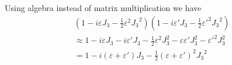 


\bigskip
Using algebra instead of matrix multiplication we have
\begin{multline*}
\left(1-i\varepsilon J_3-\tfrac{1}{2}\varepsilon^2{J_3}^2\right)
\left(1-i\varepsilon' J_3-\tfrac{1}{2}\varepsilon'^2{J_3}^2\right)
\\
{}\approx1-i\varepsilon J_3-i\varepsilon'J_3
-\tfrac{1}{2}\varepsilon^2J_3^2-\varepsilon\varepsilon'J_3^2-\varepsilon'^2J_3^2
\\
{}=1-i(\varepsilon+\varepsilon')J_3-\tfrac{1}{2}(\varepsilon+\varepsilon')^2{J_3}^2
\end{multline*}

\iffalse
For example, using
\begin{equation*}
J_3=\tfrac{1}{2}\Sigma_3
\end{equation*}

we have
\begin{multline*}
\left(1-i\varepsilon J_3-\tfrac{1}{2}\varepsilon^2{J_3}^2\right)
\left(1-i\varepsilon' J_3-\tfrac{1}{2}\varepsilon'^2{J_3}^2\right)
\\
{}=\begin{pmatrix}
1-\tfrac{1}{2}i\varepsilon-\tfrac{1}{8}\varepsilon^2&0\\
0&1+\tfrac{1}{2}i\varepsilon-\tfrac{1}{8}\varepsilon^2
\end{pmatrix}
\begin{pmatrix}
1-\tfrac{1}{2}i\varepsilon'-\tfrac{1}{8}\varepsilon'^2&0\\
0&1+\tfrac{1}{2}i\varepsilon'-\tfrac{1}{8}\varepsilon'^2
\end{pmatrix}
\\
\approx
\begin{pmatrix}
1-\tfrac{1}{2}i(\varepsilon+\varepsilon')-\tfrac{1}{8}(\varepsilon+\varepsilon')^2&0\\
0&1+\tfrac{1}{2}i(\varepsilon+\varepsilon')-\tfrac{1}{8}(\varepsilon+\varepsilon')^2
\end{pmatrix}
\\
{}=1-i(\varepsilon+\varepsilon')J_3-\tfrac{1}{2}(\varepsilon+\varepsilon')^2{J_3}^2
\end{multline*}
\fi


